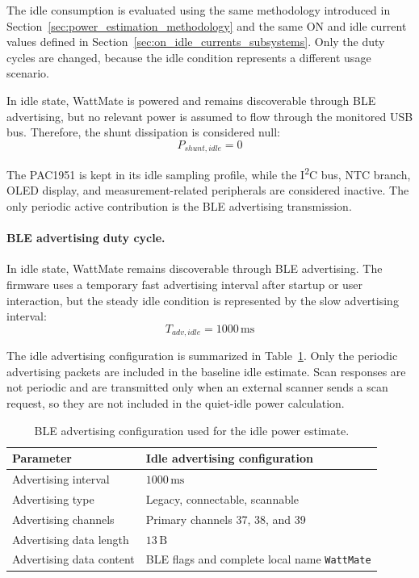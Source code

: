 The idle consumption is evaluated using the same methodology introduced in Section~\ref{sec:power_estimation_methodology} and the same ON and idle current values defined in Section~\ref{sec:on_idle_currents_subsystems}. 
Only the duty cycles are changed, because the idle condition represents a different usage scenario.

In idle state, WattMate is powered and remains discoverable through BLE advertising, but no relevant power is assumed to flow through the monitored USB bus. 
Therefore, the shunt dissipation is considered null:
\begin{equation}
	\label{eq:idle_p_shunt}
	P_{shunt,idle} = 0
\end{equation}

The PAC1951 is kept in its idle sampling profile, while the I\textsuperscript{2}C bus, NTC branch, OLED display, and measurement-related peripherals are considered inactive. 
The only periodic active contribution is the BLE advertising transmission.

\paragraph{BLE advertising duty cycle.}
In idle state, WattMate remains discoverable through BLE advertising. 
The firmware uses a temporary fast advertising interval after startup or user interaction, but the steady idle condition is represented by the slow advertising interval:
\begin{equation}
	T_{adv,idle} = 1000\,\mathrm{ms}
\end{equation}

The idle advertising configuration is summarized in Table~\ref{tab:idle_ble_advertising_config}. 
Only the periodic advertising packets are included in the baseline idle estimate. 
Scan responses are not periodic and are transmitted only when an external scanner sends a scan request, so they are not included in the quiet-idle power calculation.

\begin{table}[H]
	\centering
	\small
	\caption{BLE advertising configuration used for the idle power estimate.}
	\label{tab:idle_ble_advertising_config}
	\begin{tabular}{@{}l l@{}}
		\toprule
		\textbf{Parameter} & \textbf{Idle advertising configuration} \\
		\midrule
		Advertising interval & \(1000\,\mathrm{ms}\) \\
		Advertising type & Legacy, connectable, scannable \\
		Advertising channels & Primary channels 37, 38, and 39 \\
		Advertising data length & \(13\,\mathrm{B}\) \\
		Advertising data content & BLE flags and complete local name \texttt{WattMate} \\
		\bottomrule
	\end{tabular}
\end{table}

